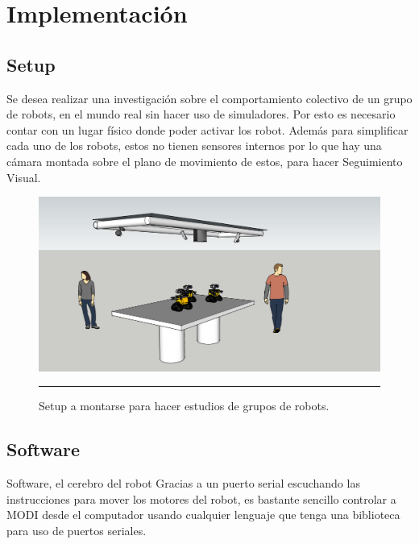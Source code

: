 \section{Implementación}


\subsection{Setup}

Se desea realizar una investigación sobre el comportamiento colectivo de un grupo de robots, en el mundo real sin hacer uso de simuladores. Por esto  es necesario contar con un lugar físico donde poder activar los robot. Además para simplificar cada uno de los robots, estos no tienen sensores internos por lo que hay una cámara montada sobre el plano de movimiento de estos, para hacer Seguimiento Visual.
\begin{figure}[htbp]
	\centering
		\includegraphics[width=\textwidth]{./Figures/setup.png}
		\rule{35em}{0.5pt}
	\caption[Setup Enjambre MODI]{Setup a montarse para hacer estudios de grupos de robots.}
	\label{fig:setup}
\end{figure}
\FloatBarrier

\subsection{Software}
Software, el cerebro del robot
Gracias a un puerto serial escuchando las instrucciones para mover los motores del robot, es bastante sencillo controlar a MODI desde el computador usando cualquier lenguaje que tenga una biblioteca para uso de puertos seriales.

